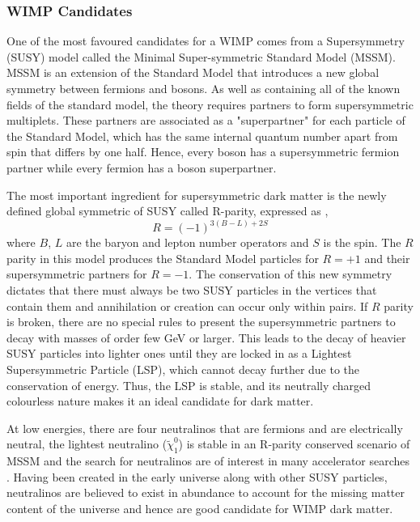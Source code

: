 \subsubsection{WIMP Candidates}
\label{subsubsec:wimp_candidates}

One of the most favoured candidates for a WIMP comes from a Supersymmetry (SUSY) model called the Minimal Super-symmetric Standard Model (MSSM). MSSM is an extension of the Standard Model that introduces a new global symmetry between fermions and bosons. As well as containing all of the known fields of the standard model, the theory requires partners to form supersymmetric multiplets. These partners are associated as a "superpartner" for each particle of the Standard Model, which has the same internal quantum number apart from spin that differs by one half. Hence, every boson has a supersymmetric fermion partner while every fermion has a boson superpartner. 

The most important ingredient for supersymmetric dark matter is the newly defined global symmetric of SUSY called R-parity, expressed as \cite{Jungman_1996},
%
\begin{equation} \label{eq:r_parity}
    R = (-1)^{3(B-L) + 2S}
\end{equation}
%
where $B$, $L$ are the baryon and lepton number operators and $S$ is the spin. The $R$ parity in this model produces the Standard Model particles for $R=+1$ and their supersymmetric partners for $R=-1$. The conservation of this new symmetry dictates that there must always be two SUSY particles in the vertices that contain them and annihilation or creation can occur only within pairs. If $R$ parity is broken, there are no special rules to present the supersymmetric partners to decay with masses of order few GeV or larger. This leads to the decay of heavier SUSY particles into lighter ones until they are locked in as a Lightest Supersymmetric Particle (LSP), which cannot decay further due to the conservation of energy. Thus, the LSP is stable, and its neutrally charged colourless nature makes it an ideal candidate for dark matter.

At low energies, there are four neutralinos that are fermions and are electrically neutral, the lightest neutralino ($\tilde{\chi}^{0}_{1}$) is stable in an R-parity conserved scenario of MSSM and the search for neutralinos are of interest in many accelerator searches \cite{Athron_2019}. Having been created in the early universe along with other SUSY particles, neutralinos are believed to exist in abundance to account for the missing matter content of the universe and hence are good candidate for WIMP dark matter. 


